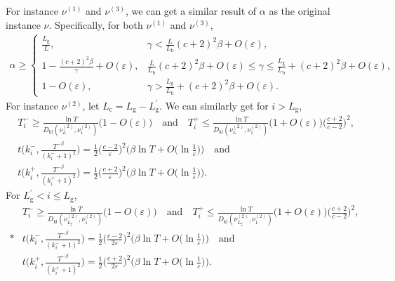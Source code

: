 \documentclass[twoside,11pt]{article}
\newcommand{\kl}{D_{\mathrm{kl}}}
\newcommand{\rmb}{\mathrm{b}}
\newcommand{\rmc}{\mathrm{c}}
\newcommand{\rmg}{\mathrm{g}}
\begin{document}
For instance $\nu^{(1)}$ and $\nu^{(3)}$, we can get a similar result of $\alpha$ as the original instance $\nu$.
Specifically, for both $\nu^{(1)}$ and $\nu^{(3)}$,
\begin{align}\label{equ:tight_alpha_two_value_13}
    \alpha \geq
    \begin{cases}
        \frac{L_{\rmg}}{L}, &\gamma < \frac{L}{L_{\rmb}} (c+2)^2\beta + O(\varepsilon),  
        \\
        1-\frac{(c+2)^2\beta}{\gamma}+O(\varepsilon) ,&
             \frac{L}{L_{\rmb}} (c+2)^2\beta  + O(\varepsilon) \leq \gamma \leq
            \frac{L_{\rmg}}{L_{\rmb}} + (c+2)^2\beta + O(\varepsilon),
        \\
        1- O(\varepsilon) , & \gamma> \frac{L_{\rmg}}{L_{\rmb}} + (c+2)^2\beta + O(\varepsilon).
    \end{cases}
\end{align}
For instance $\nu^{(2)}$, let $L_{\rmc} = L_{\rmg}-L_{\rmg}^\prime$.
We can similarly get for $i>L_{\rmg}$,
\begin{align}
    &T_i^- \geq \frac{\ln T}{\kl(\nu_L^{(2)},\nu_1^{(2)}) }\big(1-O(\varepsilon) \big)
    \quad\mbox{and}\quad
    T_i^+ \leq \frac{\ln T}{\kl(\nu_L^{(2)},\nu_1^{(2)}) }\big(1+O(\varepsilon) \big)\Big(\frac{c+2}{c-2}\Big)^2,
    \\
    &t\bigg(k_i^-,\frac{T^{-\beta}}{(k_i^-+1)^2}\bigg)
        = 
        \frac{1}{2}\Big(\frac{c-2}{\varepsilon}\Big)^2\Big(\beta\ln T + O\Big(\ln\frac{1}{\varepsilon}\Big)\Big)
    \quad\mbox{and}\\
     &t\bigg(k_i^+,\frac{T^{-\beta}}{(k_i^++1)^2}\bigg)   
        =
        \frac{1}{2}\Big(\frac{c+2}{\varepsilon}\Big)^2\Big(\beta\ln T + O\Big(\ln\frac{1}{\varepsilon}\Big)\Big).
\end{align}
For $L_{\rmg}^\prime<i\leq L_{\rmg}$,
\begin{align}
    &T_i^- \geq \frac{\ln T}{\kl(\nu_{L_{\rmg}}^{(2)},\nu_1^{(2)}) }\big(1-O(\varepsilon) \big)
    \quad\mbox{and}\quad
    T_i^+ \leq \frac{\ln T}{\kl(\nu_{L_{\rmg}}^{(2)},\nu_1^{(2)}) }\big(1+O(\varepsilon) \big)\Big(\frac{c+2}{c-2}\Big)^2,
    \\*
    &t\bigg(k_i^-,\frac{T^{-\beta}}{(k_i^-+1)^2}\bigg)
        = 
        \frac{1}{2}\Big(\frac{c-2}{2\varepsilon}\Big)^2\Big(\beta\ln T + O\Big(\ln\frac{1}{\varepsilon}\Big)\Big)
    \quad\mbox{and}\\
     &t\bigg(k_i^+,\frac{T^{-\beta}}{(k_i^++1)^2}\bigg)   
        =
        \frac{1}{2}\Big(\frac{c+2}{2\varepsilon}\Big)^2\Big(\beta\ln T + O\Big(\ln\frac{1}{\varepsilon}\Big)\Big).
\end{align}
\end{document}
